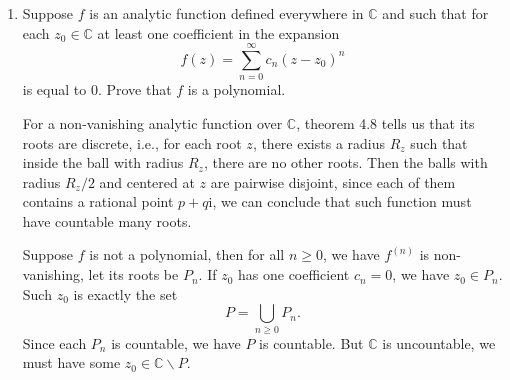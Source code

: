 \documentclass[11pt]{report}
\theoremstyle{mythm}
\let\oldendproof\endproof
\renewenvironment{proof}[1][\proofname]{%
  \oldproof[\normalfont \bfseries #1]%
}{\oldendproof}
\renewcommand*{\proofname}{Proof}
\theoremstyle{myans}
\newtheorem*{answer}{Answer}
\newcommand{\mi}{\mathrm{i}}
\newcommand{\me}{\mathrm{e}}
\newcommand{\dd}{\mathop{}\!\mathrm{d}}
\newcommand{\bbC}{\mathbb{C}}
\begin{document}
\begin{enumerate}
\begin{answer}
\begin{align*}
      &= \mi \int_0^{2\pi} \cos \theta \me^{\mi \theta}\dd \theta\\
      &= \mi \pi.
    \end{align*}
    So such $f(z)$ cannot be uniformly approximated by holomorphic functions.
  \end{answer}
  \setcounter{enumi}{12}
  \item Suppose $f$ is an analytic function defined everywhere in $\bbC$ and such that for each
  $z_0 \in \bbC$ at least one coefficient in the expansion
  \[ f(z) = \sum_{n=0}^\infty c_n (z-z_0)^n \]
  is equal to $0$. Prove that $f$ is a polynomial.
  \begin{proof}
    For a non-vanishing analytic function over $\bbC$, theorem 4.8 tells us that its roots are discrete,
    i.e., for each root $z$, there exists a radius $R_z$ such that inside the ball with radius $R_z$,
    there are no other roots. Then the balls with radius $R_z/2$ and centered at $z$ are pairwise
    disjoint, since each of them contains a rational point $p + q\mi$, we can conclude that
    such function must have countable many roots.

    Suppose $f$ is not a polynomial, then for all $n\geq 0$, we have $f^{(n)}$ is non-vanishing,
    let its roots be $P_n$. If $z_0$ has one coefficient $c_n=0$, we have $z_0\in P_n$.
    Such $z_0$ is exactly the set
    \[ P = \bigcup_{n\geq 0} P_n. \]
    Since each $P_n$ is countable, we have $P$ is countable. But $\bbC$ is uncountable, we must have
    some $z_0\in \bbC \smallsetminus P$.
  \end{proof}
\end{enumerate}
\end{document}
